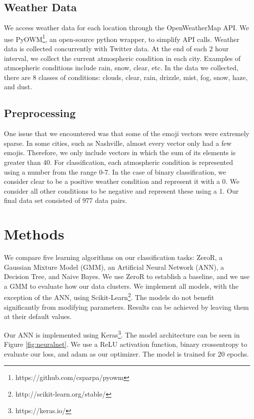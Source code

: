 \documentclass[12pt]{article}
\begin{document}
\subsection{Weather Data}
We access weather data for each location through the OpenWeatherMap API. We use PyOWM\footnote{https://github.com/csparpa/pyowm}, an open-source python wrapper, to simplify API calls. Weather data is collected concurrently with Twitter data. At the end of each 2 hour interval, we collect the current atmospheric condition in each city. Examples of atmospheric conditions include rain, snow, clear, etc. In the data we collected, there are 8 classes of conditions: clouds, clear, rain, drizzle, mist, fog, snow, haze, and dust.

\subsection{Preprocessing}\label{preprocessing}
One issue that we encountered was that some of the emoji vectors were extremely sparse. In some cities, such as Nashville, almost every vector only had a few emojis. Therefore, we only include vectors in which the sum of its elements is greater than 40. For classification, each atmospheric condition is represented using a number from the range 0-7. In the case of binary classification, we consider clear to be a positive weather condition and represent it with a 0. We consider all other conditions to be negative and represent these using a 1. Our final data set consisted of 977 data pairs.

\section{Methods}
We compare five learning algorithms on our classification tasks: ZeroR, a Gaussian Mixture Model (GMM), an Artificial Neural Network (ANN), a Decision Tree, and Naive Bayes. We use ZeroR to establish a baseline, and we use a GMM to evaluate how our data clusters. We implement all models, with the exception of the ANN, using Scikit-Learn\footnote{http://scikit-learn.org/stable/}. The models do not benefit significantly from modifying parameters. Results can be achieved by leaving them at their default values.

Our ANN is implemented using Keras\footnote{https://keras.io/}. The model architecture can be seen in Figure \ref{fig:neuralnet}. We use a ReLU activation function, binary crossentropy to evaluate our loss, and adam as our optimizer\cite{Nair2010}\cite{Kingma2015}. The model is trained for 20 epochs.
\end{document}
